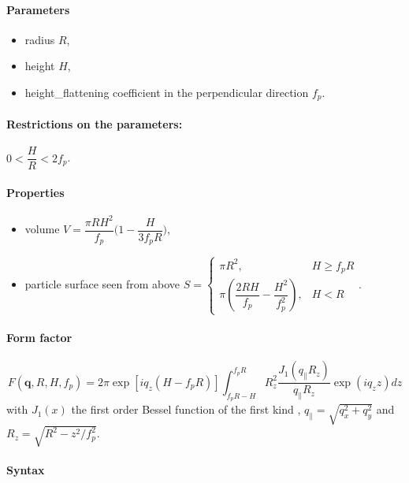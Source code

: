 \paragraph{Parameters}
\begin{itemize}
\item radius $R$,
\item height $H$,
\item height\_flattening coefficient in the perpendicular direction $f_p$.
\end{itemize}

\paragraph{Restrictions on the parameters:} $0< \dfrac{H}{R}< 2f_p$.

\paragraph{Properties}
\begin{itemize}
\item volume $V = \dfrac{\pi R H^2}{f_p}  \Big(1-\dfrac{H}{3f_p R}\Big)$,
\item particle surface seen from above $S = \left\{\begin{array}{ll} \pi R^2, & H \geq f_pR \\
         \pi\left(\dfrac{2RH}{f_p}-\dfrac{H^2}{f_p^2}\right), & H < R \end{array}\right.$.
\end{itemize}

\paragraph{Form factor}
\begin{equation*} 
F(\mathbf{q},R, H,f_p) =   2\pi \exp[iq_z(H-f_pR)] \int_{f_p R-H} ^{f_p R} R_z
        ^2\frac{J_1(q_{\parallel}R_z)}{q_{\parallel}R_z} \exp(i q_z z) dz
\end{equation*}
with $J_1(x)$ the first order
Bessel function of the first kind \cite{AbSt64}, $q_{\parallel}=\sqrt{q_x^2+q_y^2} $ and $R_z=\sqrt{R^2-z^2/f_p^2}$.

\paragraph{Syntax}\strut\\

